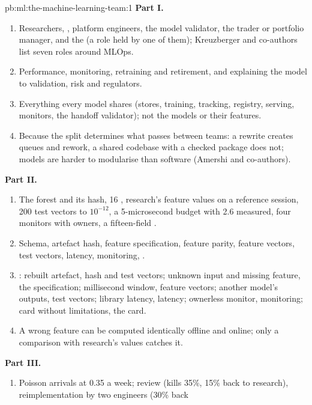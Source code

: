 \begin{solution}{pb:ml:the-machine-learning-team:1}
\textbf{Part I.}
\begin{enumerate}
\item Researchers, , platform engineers, the model validator, the trader or portfolio manager, and the
 (a role held by one of them); Kreuzberger and co-authors list seven roles around MLOps.
\item Performance, monitoring, retraining and retirement, and explaining the model to validation, risk and regulators.
\item Everything every model shares (stores, training, tracking, registry, serving, monitors, the handoff validator); not the
models or their features.
\item Because the split determines what passes between teams: a rewrite creates queues and rework, a shared codebase with a
checked package does not; models are harder to modularise than software (Amershi and co-authors).
\end{enumerate}
\textbf{Part II.}
\begin{enumerate}[resume]
\item The forest and its hash, 16 , research's feature values on a reference session, 200 test vectors to
$10^{-12}$, a 5-microsecond budget with 2.6 measured, four monitors with owners, a fifteen-field .
\item Schema, artefact hash, feature specification, feature parity, feature vectors, test vectors, latency, monitoring, .
\item {}: rebuilt artefact, hash and test vectors; unknown input and missing feature, the specification;
millisecond window, feature vectors; another model's outputs, test vectors; library latency, latency; ownerless monitor,
monitoring; card without limitations, the card.
\item A wrong feature can be computed identically offline and online; only a comparison with research's values catches it.
\end{enumerate}
\textbf{Part III.}
\begin{enumerate}[resume]
\item Poisson arrivals at 0.35 a week; review (kills 35\%, 15\% back to research), reimplementation by two engineers (30\% back

\end{enumerate}
\end{solution}
